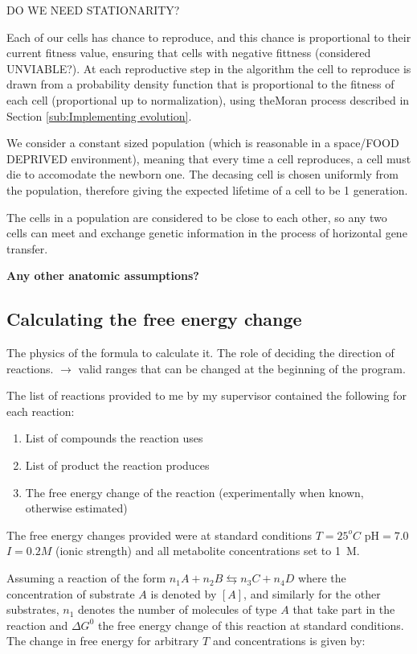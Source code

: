 \documentclass[10pt,a4paper]{article}
\begin{document}
	DO WE NEED STATIONARITY?

	Each of our cells has chance to reproduce, and this chance is proportional to their current fitness value, ensuring that cells with negative fittness (considered UNVIABLE?). At each reproductive step in the algorithm the cell to reproduce is drawn from a probability density function that is proportional to the fitness of each cell (proportional up to normalization), using theMoran process described in Section \ref{sub:Implementing evolution}.


	We consider a constant sized population (which is reasonable in a space/FOOD DEPRIVED environment), meaning that every time a cell reproduces, a cell must die to accomodate the newborn one. The decasing cell is chosen uniformly from the population, therefore giving the expected lifetime of a cell to be 1 generation.

	The cells in a population are considered to be close to each other, so  any two cells can meet and exchange genetic information in the process of horizontal gene transfer.

	\textbf{Any other anatomic assumptions?}

\subsection{Calculating the free energy change}
\label{sub:The free energy change}
The physics of the formula to calculate it. The role of deciding the direction of reactions.  $\rightarrow$ valid ranges  that can be changed at the beginning of the program.



	The list of reactions provided to me by my supervisor contained the following for each reaction: 
	\begin{enumerate}
		\item List of compounds the reaction uses
		\item List of product the reaction produces
		\item The free energy change of the reaction (experimentally when known, otherwise estimated) \cite{BartekLower}
	\end{enumerate}
	
	The free energy changes provided were at standard conditions $T=25  ^o C$ pH$=7.0$ $I=0.2 M$ (ionic strength) and all metabolite concentrations set to 1~M.
	
	Assuming a reaction of the form $n_1A + n_2B \leftrightarrows n_3C + n_4D$ where the concentration of substrate $A$ is denoted by $[A]$, and similarly for the other substrates, $n_1$ denotes the number of molecules of type $A$ that take part in the reaction and  $\Delta G^0$  the free energy change of this reaction at standard conditions. The change in free energy for arbitrary $T$ and concentrations is given by: 
	
\end{document}
